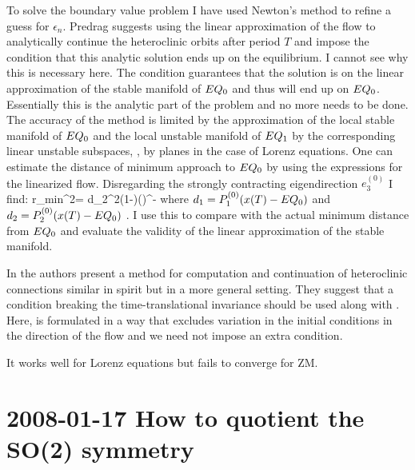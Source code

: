 To solve the boundary value problem I have used Newton's method to refine a guess for $\epsilon_n$. %
Predrag suggests using the linear approximation of the flow to analytically continue the heteroclinic
orbits after period $T$ and impose the condition that this analytic solution ends up on the equilibrium.
I cannot see why this is necessary here. The condition  guarantees that the solution
is on the linear approximation of the stable manifold of $EQ_{0}$ and thus will end up on $EQ_{0}$.
Essentially this is the analytic part of the problem and no more needs to be done. The accuracy of the
method is limited by the approximation of the local stable manifold of $EQ_{0}$ and the local unstable
manifold of $EQ_{1}$ by the corresponding linear unstable subspaces, \ie, by planes in the case of Lorenz
equations. One can estimate the distance of minimum approach to $EQ_{0}$ by using the expressions for
the linearized flow. Disregarding the strongly contracting eigendirection $e_3^{(0)}$ I find:
\beq
	r_{min}^2= d_2^2\left(1-\right)\left(\-\right)^{-}
\eeq
where $d_1=P_1^{(0)} (x(T)-EQ_{0})$ and $d_2=P_2^{(0)} (x(T)-EQ_{0})$ . I use this to compare with the actual minimum distance from $EQ_{0}$ and
evaluate the validity of the linear approximation of the stable manifold.

In  the authors present a
method for computation and continuation of heteroclinic
connections similar in spirit but in a more general setting.
They suggest that a condition breaking the time-translational
invariance should be used along with .
Here,  is formulated in a way that
excludes variation in the initial conditions in the direction
of the flow and we need not impose an extra condition.

It works well for Lorenz equations but fails to converge for ZM.



\section{2008-01-17 How to quotient the SO(2) symmetry}

